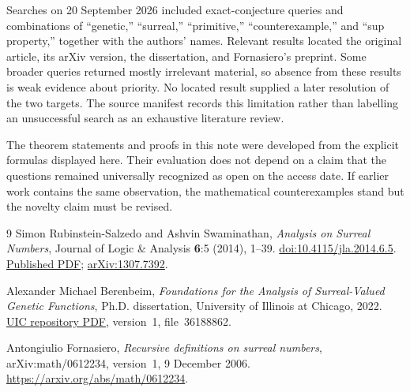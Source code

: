 \documentclass[11pt,letterpaper]{article}
\numberwithin{equation}{section}
\theoremstyle{definition}
\theoremstyle{remark}
\begin{document}
Searches on 20 September 2026 included exact-conjecture queries and
combinations of ``genetic,'' ``surreal,'' ``primitive,'' ``counterexample,''
and ``sup property,'' together with the authors' names. Relevant results
located the original article, its arXiv version, the dissertation, and
Fornasiero's preprint. Some broader queries returned mostly irrelevant
material, so absence from these results is weak evidence about priority.
No located result supplied a later resolution of the two targets.
The source manifest records this limitation rather than labelling an
unsuccessful search as an exhaustive literature review.

The theorem statements and proofs in this note were developed from the
explicit formulas displayed here. Their evaluation does not depend on a
claim that the questions remained universally recognized as open on the
access date. If earlier work contains the same observation, the
mathematical counterexamples stand but the novelty claim must be revised.

\begin{thebibliography}{9}
\small
{}
Simon Rubinstein-Salzedo and Ashvin Swaminathan,
\emph{Analysis on Surreal Numbers},
Journal of Logic \& Analysis \textbf{6}:5 (2014), 1--39.
\href{https://doi.org/10.4115/jla.2014.6.5}{doi:10.4115/jla.2014.6.5}.
\href{https://math.hawaii.edu/home/jla/210-758-1-PB.pdf}{Published PDF};
\href{https://arxiv.org/abs/1307.7392}{arXiv:1307.7392}.

Alexander Michael Berenbeim,
\emph{Foundations for the Analysis of Surreal-Valued Genetic Functions},
Ph.D. dissertation, University of Illinois at Chicago, 2022.
\href{https://indigo.uic.edu/articles/thesis/Foundations_for_the_Analysis_of_Surreal-Valued_Genetic_Functions/20253705/1/files/36188862.pdf}{UIC repository PDF}, version~1, file~36188862.

Antongiulio Fornasiero,
\emph{Recursive definitions on surreal numbers},
arXiv:math/0612234, version~1, 9 December 2006.
\url{https://arxiv.org/abs/math/0612234}.
\end{thebibliography}
\end{document}

